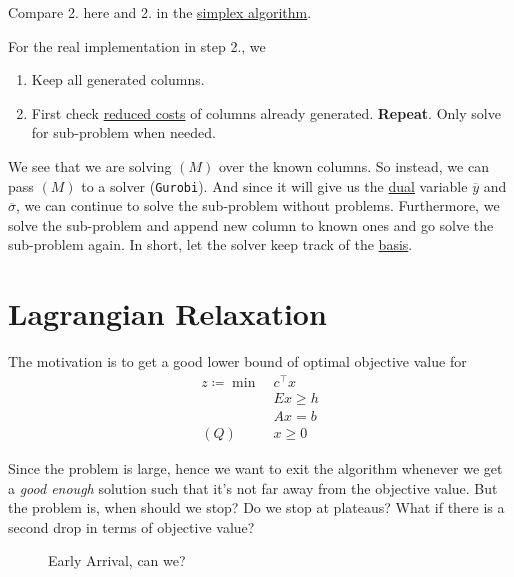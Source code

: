 \begin{note}
	Compare 2. here and 2. in the \hyperref[algo:simplex-algorithm]{simplex algorithm}.
\end{note}
\begin{remark}
	For the real implementation in step 2., we
	\begin{enumerate}
		\item Keep all generated columns.
		\item First check \hyperref[def:reduced-cost]{reduced costs} of columns already generated. \textbf{Repeat}. Only solve for sub-problem when needed.
	\end{enumerate}

	\begin{note}
		We see that we are solving \((M)\) over the known columns. So instead, we can pass \((M)\) to a solver (\texttt{Gurobi}). And since
		it will give us the \hyperref[def:dual]{dual} variable \(\overline{y}\) and \(\overline{\sigma}\), we can continue to solve the sub-problem without problems.
		Furthermore, we solve the sub-problem and append new column to known ones and go solve the sub-problem again. In short, let the solver
		keep track of the \hyperref[def:basic]{basis}.
	\end{note}
\end{remark}

\section{Lagrangian Relaxation}
The motivation is to get a good lower bound of optimal objective value for
\begin{align*}
	z\coloneqq \min~ & c^{\top}x \\
	                 & Ex \geq h \\
	                 & Ax = b    \\
	(Q)\quad         & x\geq 0
\end{align*}

Since the problem is large, hence we want to exit the algorithm whenever we get a \emph{good enough} solution such that it's not far away from the objective
value. But the problem is, when should we stop? Do we stop at plateaus? What if there is a second drop in terms of objective value?

\begin{figure}[H]
	\centering
	\caption{Early Arrival, can we?}
	\label{fig:plateau}
\end{figure}

